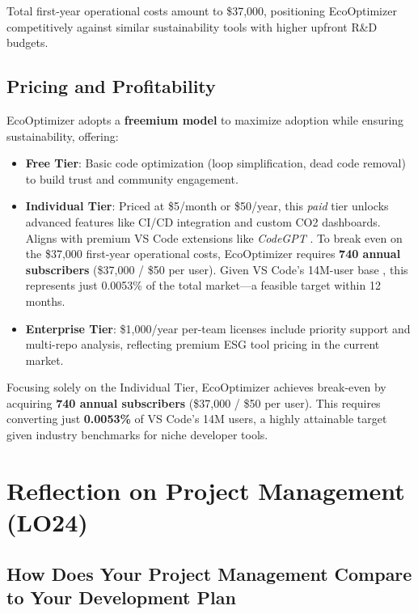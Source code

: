 \documentclass{article}
\begin{document}
\noindent Total first-year operational costs amount to \$37,000, positioning EcoOptimizer competitively against similar sustainability tools with higher upfront R\&D budgets.  

\subsection{Pricing and Profitability}  
EcoOptimizer adopts a \textbf{freemium model} to maximize adoption while ensuring sustainability, offering:  

\begin{itemize}  
    \item \textbf{Free Tier}: Basic code optimization (loop simplification, dead code removal)
     to build trust and community engagement.   

    \item \textbf{Individual Tier}: Priced at \$5/month or \$50/year, this \textit{paid} 
    tier unlocks advanced features like CI/CD integration and custom CO2 dashboards. 
    Aligns with premium VS Code extensions like \textit{CodeGPT} \cite{codeGPTPricing}.
    To break even on the \$37,000 first-year operational costs, EcoOptimizer requires 
    \textbf{740 annual subscribers} (\$37,000 / \$50 per user). Given VS Code’s 14M-user 
    base \cite{vscodeUsers}, this represents just 0.0053\% of the total market—a 
    feasible target within 12 months.

    \item \textbf{Enterprise Tier}: \$1,000/year per-team licenses include priority 
    support and multi-repo analysis, reflecting premium ESG tool pricing in the current market.

\end{itemize}  

\noindent Focusing solely on the Individual Tier, EcoOptimizer achieves break-even by 
acquiring \textbf{740 annual subscribers} (\$37,000 / \$50 per user). This requires 
converting just \textbf{0.0053\%} of VS Code’s 14M users, a highly attainable target 
given industry benchmarks for niche developer tools.  

\section{Reflection on Project Management (LO24)}


\subsection{How Does Your Project Management Compare to Your Development Plan}
\end{document}
